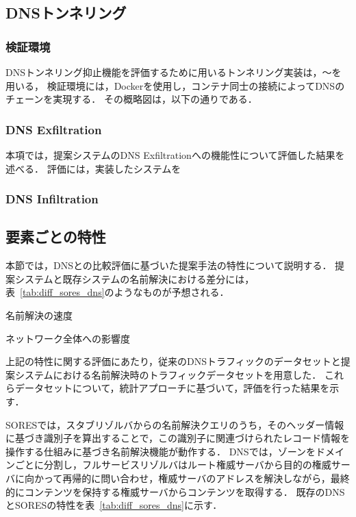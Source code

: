 \subsection{DNSトンネリング}
\label{sec:eval-tunnel}
\subsubsection{検証環境}
DNSトンネリング抑止機能を評価するために用いるトンネリング実装は，〜を用いる，
検証環境には，Dockerを使用し，コンテナ同士の接続によってDNSのチェーンを実現する．
その概略図は，以下の通りである．

\subsubsection{DNS Exfiltration}
本項では，提案システムのDNS Exfiltrationへの機能性について評価した結果を述べる．
評価には，実装したシステムを
\subsubsection{DNS Infiltration}


\subsection{要素ごとの特性}
\label{sec:eval-feature}
本節では，DNSとの比較評価に基づいた提案手法の特性について説明する．
提案システムと既存システムの名前解決における差分には，表~\ref{tab:diff_sores_dns}のようなものが予想される．



\begin{description}
 \setlength{\itemsep}{0pt}
 \setlength{\leftskip}{1.0cm}
 \item[RTT:] 名前解決の速度
 \item[トラフィック量:] ネットワーク全体への影響度
\end{description}

上記の特性に関する評価にあたり，従来のDNSトラフィックのデータセットと提案システムにおける名前解決時のトラフィックデータセットを用意した．
これらデータセットについて，統計アプローチに基づいて，評価を行った結果を示す．


SORESでは，スタブリゾルバからの名前解決クエリのうち，そのヘッダー情報に基づき識別子を算出することで，この識別子に関連づけられたレコード情報を操作する仕組みに基づき名前解決機能が動作する．
DNSでは，ゾーンをドメインごとに分割し，フルサービスリゾルバはルート権威サーバから目的の権威サーバに向かって再帰的に問い合わせ，権威サーバのアドレスを解決しながら，最終的にコンテンツを保持する権威サーバからコンテンツを取得する．
既存のDNSとSORESの特性を表~\ref{tab:diff_sores_dns}に示す．



